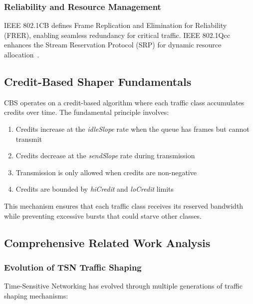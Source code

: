 \documentclass[10pt, journal, compsoc]{IEEEtran}
\begin{document}
\subsubsection{Reliability and Resource Management}
IEEE 802.1CB defines Frame Replication and Elimination for Reliability (FRER), enabling seamless redundancy for critical traffic. IEEE 802.1Qcc enhances the Stream Reservation Protocol (SRP) for dynamic resource allocation~\cite{ieee8021cb}.

\subsection{Credit-Based Shaper Fundamentals}

CBS operates on a credit-based algorithm where each traffic class accumulates credits over time. The fundamental principle involves:

\begin{enumerate}
    \item Credits increase at the \textit{idleSlope} rate when the queue has frames but cannot transmit
    \item Credits decrease at the \textit{sendSlope} rate during transmission
    \item Transmission is only allowed when credits are non-negative
    \item Credits are bounded by \textit{hiCredit} and \textit{loCredit} limits
\end{enumerate}

This mechanism ensures that each traffic class receives its reserved bandwidth while preventing excessive bursts that could starve other classes.

\subsection{Comprehensive Related Work Analysis}

\subsubsection{Evolution of TSN Traffic Shaping}

Time-Sensitive Networking has evolved through multiple generations of traffic shaping mechanisms:
\end{document}
